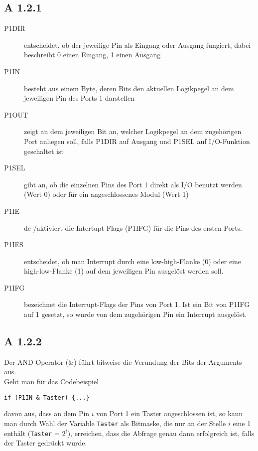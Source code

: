 \documentclass[11pt,a4paper,ngerman]{article}
\begin{document}
\subsection*{A 1.2.1}
\begin{description}
\item[P1DIR] entscheidet, ob der jeweilige Pin als Eingang oder Ausgang fungiert, dabei beschreibt 0 einen Eingang, 1 einen Ausgang
\item[P1IN] besteht aus einem Byte, deren Bits den aktuellen Logikpegel an dem jeweiligen Pin des Ports 1 darstellen
\item[P1OUT] zeigt an dem jeweiligen Bit an, welcher Logikpegel an dem zugehörigen Port anliegen soll, falls P1DIR auf Ausgang und P1SEL auf I/O-Funktion geschaltet ist
\item[P1SEL] gibt an, ob die einzelnen Pins des Port 1 direkt als I/O benutzt werden (Wert 0) oder für ein angeschlossenes Modul (Wert 1)
\item[P1IE] de-/aktiviert die Intertupt-Flags (P1IFG) für die Pins des ersten Ports.
\item[P1IES] entscheidet, ob man Interrupt durch eine low-high-Flanke (0) oder eine high-low-Flanke (1) auf dem jeweiligen Pin ausgelöst werden soll.
\item[P1IFG] bezeichnet die Interrupt-Flags der Pins von Port 1. Ist ein Bit von P1IFG auf 1 gesetzt, so wurde von dem zugehörigen Pin ein Interrupt ausgelöst.
\end{description}

\subsection*{A 1.2.2}
Der AND-Operator (\&) führt bitweise die Verundung der Bits der Arguments aus.\\
Geht man für das Codebeispiel
\begin{lstlisting}
if (P1IN & Taster) {...}
\end{lstlisting}
davon aus, dass an dem Pin $i$ von Port 1 ein Taster angeschlossen ist, so kann man durch Wahl der Variable \texttt{Taster} als Bitmaske, die nur an der Stelle $i$ eine 1 enthält (\texttt{Taster} = $2^i$), erreichen, dass die Abfrage genau dann erfolgreich ist, falls der Taster gedrückt wurde.
\end{document}
